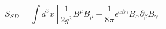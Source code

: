 \begin{equation}
S_{SD}=\int d^{3}x[\frac{1}{2g^2}B^\mu B_\mu-\frac{1}{8\pi}\epsilon ^{\alpha\beta\gamma}B_\alpha\partial _\beta B_\gamma ]
\label{sd}
\end{equation}

